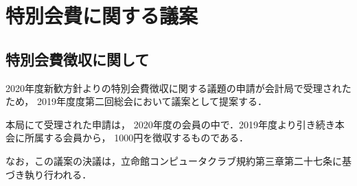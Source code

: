 \section{特別会費に関する議案}
\subsection*{特別会費徴収に関して}

2020年度新歓方針よりの特別会費徴収に関する議題の申請が会計局で受理されたため，
2019年度度第二回総会において議案として提案する．

本局にて受理された申請は，
2020年度の会員の中で．2019年度より引き続き本会に所属する会員から，
1000円を徴収するものである．

なお，この議案の決議は，立命館コンピュータクラブ規約第三章第二十七条に基づき執り行われる．